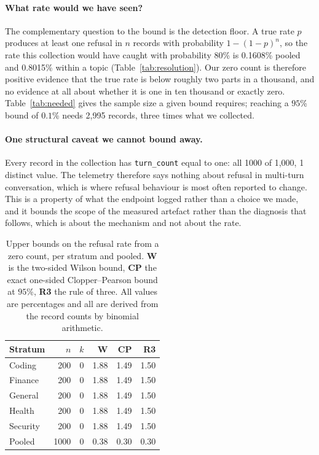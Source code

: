 \documentclass[journal]{IEEEtran}
\theoremstyle{definition}
\newcommand{\TNtel}{1{,}000}
\newcommand{\TDetectPooled}{0.1608}
\newcommand{\TDetectStratum}{0.8015}
\newcommand{\TNeedTenth}{2{,}995}
\newcommand{\TTurnsOne}{1000}
\newcommand{\TTurnKinds}{1}
\begin{document}
\paragraph{What rate would we have seen?} The complementary question to the
bound is the detection floor. A true rate $p$ produces at least one refusal in
$n$ records with probability $1-(1-p)^n$, so the rate this collection would have
caught with probability $80$\% is \TDetectPooled\% pooled and \TDetectStratum\%
within a topic (Table~\ref{tab:resolution}). Our zero count is therefore
positive evidence that the true rate is below roughly two parts in a thousand,
and no evidence at all about whether it is one in ten thousand or exactly zero.
Table~\ref{tab:needed} gives the sample size a given bound requires; reaching a
$95$\% bound of $0.1$\% needs \TNeedTenth{} records, three times what we
collected.

\paragraph{One structural caveat we cannot bound away.} Every record in the
collection has \texttt{turn\_count} equal to one: all \TTurnsOne{} of \TNtel{},
\TTurnKinds{} distinct value. The telemetry therefore says nothing about refusal
in multi-turn conversation, which is where refusal behaviour is most often
reported to change. This is a property of what the endpoint logged rather than a
choice we made, and it bounds the scope of the measured artefact rather than the
diagnosis that follows, which is about the mechanism and not about the rate.

\begin{table}[t]
\centering
\caption{Upper bounds on the refusal rate from a zero count, per stratum and
pooled. \textbf{W} is the two-sided Wilson bound, \textbf{CP} the exact one-sided
Clopper--Pearson bound at $95$\%, \textbf{R3} the rule of three. All values are
percentages and all are derived from the record counts by binomial arithmetic.}
\label{tab:stratabounds}
\footnotesize
\setlength{\tabcolsep}{5pt}
\begin{tabular}{@{}lrrrrr@{}}
\toprule
Stratum & $n$ & $k$ & W & CP & R3 \\
\midrule
Coding & 200 & 0 & 1.88 & 1.49 & 1.50 \\
Finance & 200 & 0 & 1.88 & 1.49 & 1.50 \\
General & 200 & 0 & 1.88 & 1.49 & 1.50 \\
Health & 200 & 0 & 1.88 & 1.49 & 1.50 \\
Security & 200 & 0 & 1.88 & 1.49 & 1.50 \\
\midrule
Pooled & 1000 & 0 & 0.38 & 0.30 & 0.30 \\
\bottomrule
\end{tabular}
\end{table}
\end{document}
